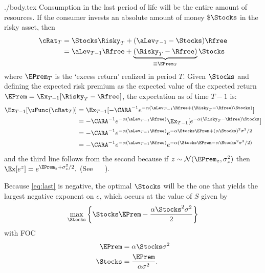 \documentclass{handout}
\begin{document}
\begin{verbatimwrite}{./body.tex}
Consumption in the last period of life will be the entire amount
of resources.  If the consumer invests an absolute amount of money \$$\Stocks$ in the risky asset, then
\begin{equation*}\begin{gathered}\begin{aligned}
        \cRat_{T} & =  \Stocks \Risky_{T}+( \aLev_{T-1}-\Stocks)\Rfree  \\
         & =   \aLev_{T-1}\Rfree + \underbrace{(\Risky_{T}-\Rfree)}_{\equiv \EPrem_{T}}\Stocks
\end{aligned}\end{gathered}\end{equation*}
where $\EPrem_{T}$ is the `excess return' realized in period $T$.  Given
$\Stocks$ and defining the expected risk premium as the expected value of the expected return $\EPrem =
\Ex_{T-1}[\Risky_{T}-\Rfree]$, the expectation as of time $T-1$ is:
\begin{equation}\begin{gathered}\begin{aligned}
        \Ex_{T-1}[\uFunc(\cRat_{T})] & =  \Ex_{T-1}[-\CARA^{-1}e^{-\alpha( \aLev_{T-1}\Rfree+(\Risky_{T}-\Rfree)\Stocks)}] \notag
\\ & =  -\CARA^{-1}e^{-\alpha( \aLev_{T-1}\Rfree)} \Ex_{T-1}[e^{-\alpha(\Risky_{T}-\Rfree)\Stocks}]     %
\\ & =  -\CARA^{-1}e^{-\alpha( \aLev_{T-1}\Rfree)} e^{-\alpha\Stocks\EPrem+(\alpha\Stocks)^{2}\sigma^{2}/2}   
\\ & =  -\CARA^{-1} e^{-\alpha( \aLev_{T-1}\Rfree)} 
e^{-\alpha(\Stocks\EPrem-\alpha\Stocks^{2}\sigma^{2}/2)} \label{eq:last}
\end{aligned}\end{gathered}\end{equation}
and the third line follows from the second because if $z \sim \mathcal{N}(\EPrem_{z},\sigma_{z}^{2})$
then $\Ex[e^{z}] = e^{\EPrem_{z}+\sigma_{z}^{2}/2}.$  (See \MathFactsList~~ \ELogNorm).

Because \eqref{eq:last} is negative, the optimal $\Stocks$ will be the 
one that yields the largest negative exponent on $e$, which occurs at the value of $S$
given by
\begin{equation}
\max_{\Stocks} \left\{ \Stocks \EPrem - \frac{\alpha \Stocks^{2} \sigma^{2}}{2} \right\}
\end{equation}
with FOC
\begin{equation}\begin{gathered}\begin{aligned}
        \EPrem & =  \alpha \Stocks \sigma^{2}  \\
        \Stocks & =  \frac{\EPrem}{\alpha \sigma^{2}}.
\end{aligned}\end{gathered}\end{equation}


\end{verbatimwrite}
\end{document}
